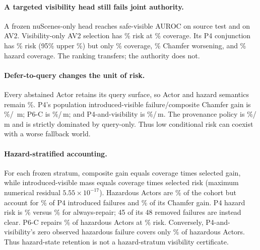 \paragraph{A targeted visibility head still fails joint authority.}
A frozen nuScenes-only head reaches safe-visible AUROC \PtwelveSourceSafeAUROC{} on source test and
\PtwelveExternalSafeAUROC{} on AV2. Visibility-only AV2 selection has \PtwelveVisibilityRisk{}\% risk at
\PtwelveVisibilityCoverage{}\% coverage. Its P4 conjunction has \PtwelveDualVisibleRisk{}\% risk (95\% upper
\PtwelveDualVisibleUpper{}\%) but only \PtwelveDualCoverage{}\% coverage, \PtwelveDualChamferWorse{}\% Chamfer worsening,
and \PtwelveDualHazardCoverage{}\% hazard coverage. The ranking transfers; the authority does not.

\paragraph{Defer-to-query changes the unit of risk.}
Every abstained Actor retains its query surface, so Actor and hazard semantics remain \PthirteenActorRetention{}\%. P4's
population introduced-visible failure/composite Chamfer gain is \PthirteenPfourPopulationVisible{}\%/
\PthirteenPfourGain{}\,m; P6-C is \PthirteenPsixPopulationVisible{}\%/\PthirteenPsixGain{}\,m; and P4-and-visibility is
\PthirteenDualPopulationVisible{}\%/\PthirteenDualGain{}\,m. The provenance policy is
\PthirteenProvenancePopulationVisible{}\%/\PthirteenProvenanceGain{}\,m and is strictly dominated by query-only. Thus low
conditional risk can coexist with a worse fallback world.

\paragraph{Hazard-stratified accounting.}
For each frozen stratum, composite gain equals coverage times selected gain, while introduced-visible mass equals coverage
times selected risk (maximum numerical residual $5.55\times10^{-17}$). Hazardous Actors are
\PfourteenHazardActorShare{}\% of the cohort but account for \PfourteenPfourHazardFailureShare{}\% of P4 introduced failures
and \PfourteenPfourHazardGainShare{}\% of its Chamfer gain. P4 hazard risk is \PfourteenPfourHazardRisk{}\% versus
\PfourteenAlwaysHazardRisk{}\% for always-repair; 45 of its 48 removed failures are instead clear. P6-C repairs
\PfourteenPsixHazardCoverage{}\% of hazardous Actors at \PfourteenPsixHazardRisk{}\% risk. Conversely, P4-and-visibility's
zero observed hazardous failure covers only \PfourteenDualHazardCoverage{}\% of hazardous Actors. Thus hazard-state retention
is not a hazard-stratum visibility certificate.

